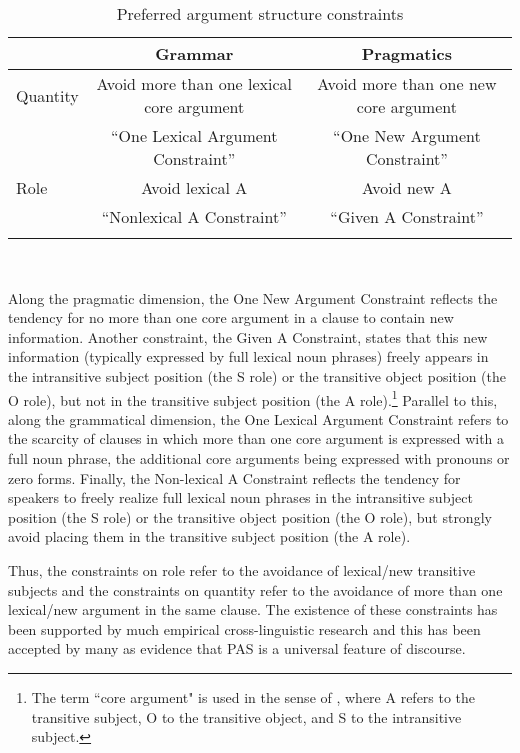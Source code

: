 \begin{table}

\caption{{Preferred argument structure constraints \citep[34]{dubois2003a}}}
\begin{tabularx}{\textwidth}{ lCC }
\lsptoprule
 & Grammar & Pragmatics  \\ 
\midrule 
Quantity & Avoid more than one lexical core argument  & Avoid more than one new core argument   \\ 
   & ``One Lexical Argument Constraint'' & ``One New Argument Constraint'' \\ 
    
\midrule 
 Role & Avoid lexical A & Avoid new A  \\ 
 & ``Nonlexical A  Constraint''& ``Given A  Constraint''\\ 
\lspbottomrule
\end{tabularx}\\
\label{constraints} 
\end{table}

Along the pragmatic dimension, the One New Argument Constraint reflects the tendency for no more than one core argument in a clause to contain new information. Another constraint, the Given A Constraint, states that this new information (typically expressed by full lexical noun phrases) freely appears in the intransitive subject position (the S role) or the transitive object position (the O role), but not in the transitive subject position (the A role).\footnote{The term ``core argument" is used in the sense of \citet{dixon1979}, where A refers to the transitive subject, O to the transitive object, and S to the intransitive subject.} Parallel to this, along the grammatical dimension, the One Lexical Argument Constraint refers to the scarcity of clauses in which more than one core argument is expressed with a full noun phrase, the additional core arguments being expressed with pronouns or zero forms. Finally, the Non-lexical A Constraint reflects the tendency for speakers to freely realize full lexical noun phrases in the intransitive subject position (the S role) or the transitive object position (the O role), but strongly avoid placing them in the transitive subject position (the A role). 

Thus, the constraints on role refer to the avoidance of lexical/new transitive subjects and the constraints on quantity refer to the avoidance of more than one lexical/new argument in the same clause. The existence of these constraints has been supported by much empirical cross-linguistic research and this has been accepted by many as evidence that PAS is a universal feature of discourse.  

